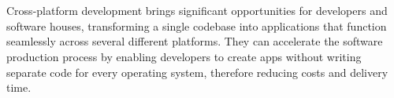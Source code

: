 


\chapter*{}

Cross-platform development brings significant opportunities for developers and software houses, transforming a single codebase into applications that function seamlessly across several different platforms. They can accelerate the software production process by enabling developers to create apps without writing separate code for every operating system, therefore reducing costs and delivery time.